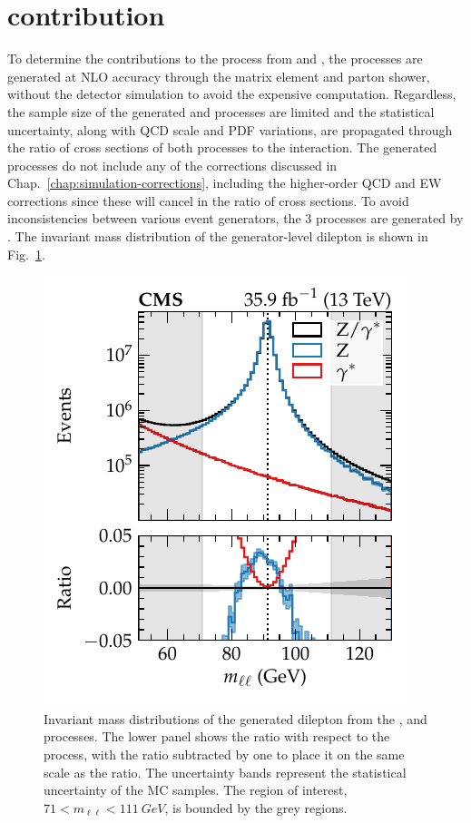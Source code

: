 \section{\Pgstar contribution}

To determine the contributions to the \IDYll process from \IZll and \Igstarll,
the processes are generated at NLO accuracy through the matrix element and
parton shower, without the detector simulation to avoid the expensive
computation. Regardless, the sample size of the generated \IZll and \Igstarll
processes are limited and the statistical uncertainty, along with QCD scale
and PDF variations, are propagated through the ratio of cross sections of both
processes to the \IDYll interaction. The generated processes do not include
any of the corrections discussed in Chap.~\ref{chap:simulation-corrections},
including the higher-order QCD and EW corrections since these will cancel in
the ratio of cross sections. To avoid inconsistencies between various event
generators, the 3 processes are generated by \MADGRAPH. The invariant mass
distribution of the generator-level dilepton is shown in
Fig.~\ref{fig:gstar_invmass}.
%
\begin{figure}
    \centering
    \includegraphics{chapters/042_backgrounds/images/gstar_invmass.pdf}
    \caption[Invariant mass distributions of the \IDYll, \IZll and \Igstarll processes.]{
        Invariant mass distributions of the generated dilepton from the \IDYll, \IZll and \Igstarll processes. The lower panel shows the ratio with respect to the \IDYll process, with the \IZll ratio subtracted by one to place it on the same scale as the \Igstar ratio. The uncertainty bands represent the statistical uncertainty of the MC samples. The region of interest, ${71<m_{\ell\ell}<\SI{111}{GeV}}$, is bounded by the grey regions.
    }
    \label{fig:gstar_invmass}
\end{figure}
